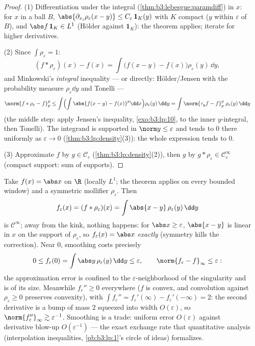 \begin{proof}
(1) Differentiation under the integral
(\cref{thm:b3:lebesgue:paramdiff}) in $x$: for $x$ in a ball
$B$, $\abs{\partial_{x_i}\rho_\varepsilon(x - y)} \leq
C_\varepsilon\,\mathbf 1_{K}(y)$ with $K$ compact ($y$ within
$\varepsilon$ of $B$), and $\abs f\,\mathbf 1_K \in L^1$
(H\"older against $\mathbf 1_K$): the theorem applies;
iterate for higher derivatives.

(2) Since $\int\rho_\varepsilon = 1$:
\[
(f * \rho_\varepsilon)(x) - f(x)
= \int \bigl(f(x - y) - f(x)\bigr)\rho_\varepsilon(y)\,\dd y ,
\]
and Minkowski's \emph{integral} inequality --- or directly:
H\"older/Jensen with the probability measure
$\rho_\varepsilon\dd y$ and Tonelli ---
\[
\norm{f*\rho_\varepsilon - f}_p^p
\leq \int\Bigl(\int\abs{f(x-y) -
f(x)}^p\dd x\Bigr)\rho_\varepsilon(y)\,\dd y
= \int \norm{\tau_yf - f}_p^p\;\rho_\varepsilon(y)\,\dd y
\]
(the middle step: apply Jensen's inequality,
\cref{exo:b3:lp:10}, to the inner $y$-integral, then Tonelli).
The integrand is supported in $\norm y \leq \varepsilon$ and
tends to $0$ there uniformly as $\varepsilon \to 0$
(\cref{thm:b3:lp:density}(3)): the whole expression tends to
$0$.

(3) Approximate $f$ by $g \in \mathcal C_c$
(\cref{thm:b3:lp:density}(2)), then $g$ by $g *
\rho_\varepsilon \in \mathcal C_c^\infty$ (compact support:
sum of supports).
\end{proof}

\begin{example}
\label{ex:b3:lp:mollifyexample}
Take $f(x) = \abs x$ on $\R$ (locally $L^1$; the theorem
applies on every bounded window) and a symmetric mollifier
$\rho_\varepsilon$. Then
\[
f_\varepsilon(x) = (f * \rho_\varepsilon)(x)
= \int\abs{x - y}\,\rho_\varepsilon(y)\,\dd y
\]
is $\mathcal C^\infty$; away from the kink, nothing happens:
for $\abs x \geq \varepsilon$, $\abs{x - y}$ is linear in $x$
on the support of $\rho_\varepsilon$, so $f_\varepsilon(x) =
\abs x$ \emph{exactly} (symmetry kills the correction).
Near $0$, smoothing costs precisely
\[
0 \leq f_\varepsilon(0) = \int\abs
y\,\rho_\varepsilon(y)\,\dd y \leq \varepsilon,
\qquad
\norm{f_\varepsilon - f}_\infty \leq \varepsilon :
\]
the approximation error is confined to the
$\varepsilon$-neighborhood of the singularity and is of its
size. Meanwhile $f_\varepsilon'' \geq 0$ everywhere
($f$ is convex, and convolution against $\rho_\varepsilon
\geq 0$ preserves convexity), with $\int f_\varepsilon'' =
f_\varepsilon'(\infty) - f_\varepsilon'(-\infty) = 2$: the
second derivative is a bump of mass $2$ squeezed into width
$O(\varepsilon)$, so $\norm{f_\varepsilon''}_\infty \gtrsim
\varepsilon^{-1}$. Smoothing is a trade: uniform error
$O(\varepsilon)$ against derivative blow-up
$O(\varepsilon^{-1})$ --- the exact exchange rate that
quantitative analysis (interpolation inequalities,
\cref{pb:b3:lp:1}'s circle of ideas) formalizes.
\end{example}

